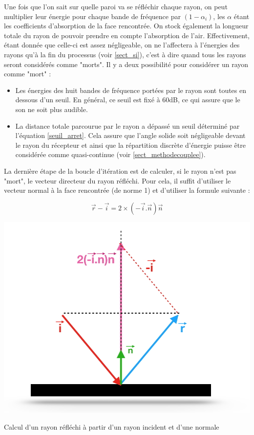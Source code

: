 Une fois que l'on sait sur quelle paroi va se réfléchir chaque rayon, on peut multiplier leur énergie pour chaque bande de fréquence par $(1-\alpha_i)$, les $\alpha$ étant les coefficients d'absorption de la face rencontrée. On stock également la longueur totale du rayon de pouvoir prendre en compte l'absorption de l'air. Effectivement, étant donnée que celle-ci est assez négligeable, on ne l'affectera à l'énergies des rayons qu'à la fin du processus (voir \ref{sect_si}), c'est à dire quand tous les rayons seront considérés comme "morts". Il y a deux possibilité pour considérer un rayon comme "mort" : 
\begin{itemize}
	\item Les énergies des huit bandes de fréquence portées par le rayon sont toutes en dessous d'un seuil. En général, ce seuil est fixé à 60dB, ce qui assure que le son ne soit plus audible.
	\item La distance totale parcourue par le rayon a dépassé un seuil déterminé par l'équation \ref{seuil_arret}. Cela assure que l'angle solide soit négligeable devant le rayon du récepteur et ainsi 	que la répartition discrète d'énergie puisse être considérée comme quasi-continue (voir \ref{sect_methodecouplee}).
\end{itemize}

La dernière étape de la boucle d'itération est de calculer, si le rayon n'est pas "mort", le vecteur directeur du rayon réfléchi. Pour cela, il suffit d'utiliser le vecteur normal à la face rencontrée (de norme 1) et d'utiliser la formule suivante :

\begin{equation}
\overrightarrow{r} - \overrightarrow{i} = 2 \times (-\overrightarrow{i}.\overrightarrow{n})\overrightarrow{n}
\end{equation}

\begin{figureth}
	\includegraphics[width=0.6\linewidth]{images/rayRefl}
	\caption{Calcul d'un rayon réfléchi à partir d'un rayon incident et d'une normale}
	\label{rayRefl}
\end{figureth}

